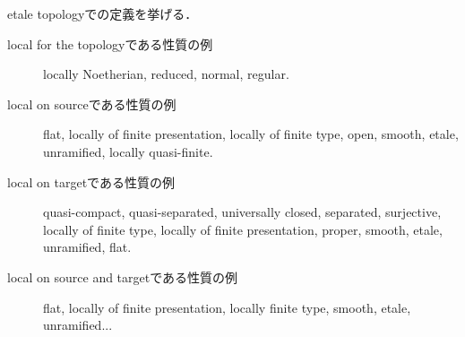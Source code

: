 \documentclass[a4paper, dvipdfmx]{jsarticle}
\begin{document}
\begin{Example}
    etale topologyでの定義を挙げる．
    \begin{description}
    \item[local for the topologyである性質の例] \mnewline
        locally Noetherian, reduced, normal, regular.

    \item[local on sourceである性質の例] \mnewline
        flat, locally of finite presentation, locally of finite type, open,
        smooth, etale, unramified, locally quasi-finite.

    \item[local on targetである性質の例] \mnewline
        quasi-compact, quasi-separated, universally closed, separated, surjective,
        locally of finite type, locally of finite presentation,
        proper, smooth, etale, unramified, flat.

    \item[local on source and targetである性質の例] \mnewline
        flat, locally of finite presentation, locally finite type,
        smooth, etale, unramified...
    \end{description}
\end{Example}
\end{document}
